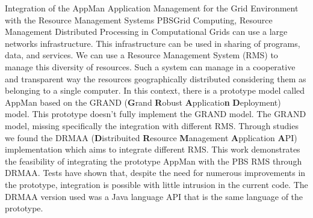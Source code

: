 \begin{englishabstract}{Integration of the AppMan Application Management for the Grid Environment with the Resource Management Systems PBS}{Grid Computing, Resource Management}
Distributed Processing in Computational Grids can use a large  networks infrastructure. This infrastructure can be used in sharing of programs, data, and services. We can use a Resource Management System (RMS) to manage this diversity of resources.  Such a system can manage in a cooperative and transparent way the resources geographically distributed considering them as belonging to a single computer. In this context, there is a prototype model called AppMan based on the GRAND ({\bf G}rand {\bf R}obust {\bf A}pplicatio{\bf n} {\bf D}eployment) model. This prototype doesn't fully implement the GRAND model. The GRAND model, missing specifically the integration with different RMS. Through studies we found the DRMAA ({\bf D}istribuited {\bf R}esource {\bf M}anagement {\bf A}pplication {\bf A}PI) implementation which aims to integrate different RMS. This work demonstrates the feasibility of integrating the prototype AppMan with the PBS RMS through DRMAA. Tests have shown that, despite the need for numerous improvements in the prototype, integration is possible with little intrusion in the current code. The DRMAA version used was a Java language API that is the same language of the prototype.
\end{englishabstract}